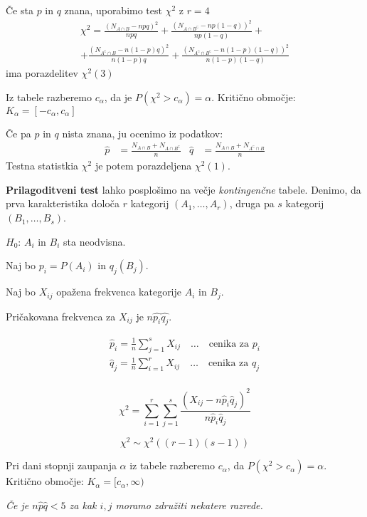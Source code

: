 \begin{multicols}{5}
Če sta $p$ in $q$ znana, uporabimo test $\chi^2$ z $r = 4$
{\small
\begin{multline*}
    \chi^2 = \frac{(N_{A \cap B} - npq)^2}{npq} + \frac{(N_{A \cap B^\complement} - np(1-q))^2}{np(1-q)} + \\ + \frac{(N_{A^\complement \cap B} - n(1-p)q)^2}{n(1-p)q} + \frac{(N_{A^\complement \cap B^\complement} - n(1-p)(1-q))^2}{n(1-p)(1-q)}
\end{multline*}}
ima porazdelitev $\chi^2(3)$

Iz tabele razberemo $c_\alpha$, da je $P(\chi^2 > c_\alpha) = \alpha$. Kritično območje: $K_\alpha = [-c_\alpha, c_\alpha]$

Če pa $p$ in $q$ nista znana, ju ocenimo iz podatkov:
\begin{align*}
    \hat{p} &= \frac{N_{A\cap B} + N_{A \cap B^\complement}}{n} &
    \hat{q} &= \frac{N_{A\cap B} + N_{A^\complement \cap B}}{n}
\end{align*}
Testna statistkia $\chi^2$ je potem porazdeljena $\chi^2(1)$.

\textbf{Prilagoditveni test} lahko posplošimo na večje \textit{kontingenčne} tabele. 
Denimo, da prva karakteristika določa $r$ kategorij $(A_1, \dots, A_r)$, druga pa $s$ kategorij $(B_1, \dots, B_s)$.

$H_0$: $A_i$ in $B_i$ sta neodvisna.

Naj bo $p_i = P(A_i)$ in $q_j(B_j)$.

Naj bo $X_{ij}$ opažena frekvenca kategorije $A_i$ in $B_j$.

Pričakovana frekvenca za $X_{ij}$ je $n\hat{p_i} \hat{q_j}$.

\begin{align*}
    \hat{p}_i = \frac{1}{n} \sum_{j=1}^s X_{ij} \quad \dots \quad \text{cenika za } p_i \\
    \hat{q}_j = \frac{1}{n} \sum_{i=1}^r X_{ij} \quad \dots \quad \text{cenika za } q_j \\
\end{align*}

\[ \chi^2 = \sum_{i=1}^r \sum_{j=1}^s \frac{(X_{ij} - n\hat{p}_i \hat{q}_j)^2}{n\hat{p}_i \hat{q}_j}\]

\[ \chi^2 \sim \chi^2((r-1)(s-1))\]

Pri dani stopnji zaupanja $\alpha$ iz tabele razberemo $c_\alpha$, da $P(\chi^2 > c_\alpha) = \alpha$. 
Kritično območje: $K_\alpha = [c_\alpha, \infty)$

\textit{Če je $n\hat{p}\hat{q} < 5$ za kak $i, j$ moramo združiti nekatere razrede.}


\end{multicols}
